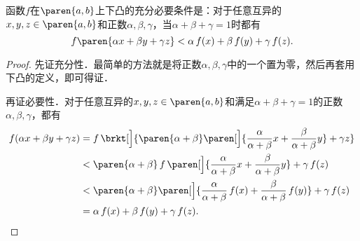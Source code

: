 \begin{example*}
  函数\(f\)在\(\paren{a,b}\)上下凸的充分必要条件是：对于任意互异的\(x, y, z \in \paren{a,b}\)和正数\(\alpha, \beta, \gamma\)，当\(\alpha+\beta+\gamma=1\)时都有
  \[
    f\paren{\alpha x + \beta y + \gamma z} < \alpha\,f(x) + \beta\,f(y) + \gamma\,f(z).
  \]

  \begin{proof}
    先证充分性．最简单的方法就是将正数\(\alpha, \beta, \gamma\)中的一个置为零，然后再套用下凸的定义，即可得证．

    再证必要性．对于任意互异的\(x, y, z \in \paren{a,b}\)和满足\(\alpha+\beta+\gamma=1\)的正数\(\alpha, \beta, \gamma\)，都有
    \[
      \begin{split}
        f(\alpha x + \beta y + \gamma z)
        &= f\,\brkt[\Big]{\paren{\alpha+\beta}\paren[\Big]{\frac{\alpha}{\alpha+\beta} x + \frac{\beta}{\alpha+\beta} y} + \gamma z} \\
        &< \paren{\alpha+\beta}\,f\,\paren[\Big]{\frac{\alpha}{\alpha+\beta} x + \frac{\beta}{\alpha+\beta} y} + \gamma\,f(z) \\
        &< \paren{\alpha+\beta}\paren[\Big]{\frac{\alpha}{\alpha+\beta}\,f(x) + \frac{\beta}{\alpha+\beta}\,f(y)} + \gamma\,f(z) \\
        &= \alpha\,f(x) + \beta\,f(y) + \gamma\,f(z). \qedhere
      \end{split}
    \]


\end{proof}
\end{example*}
